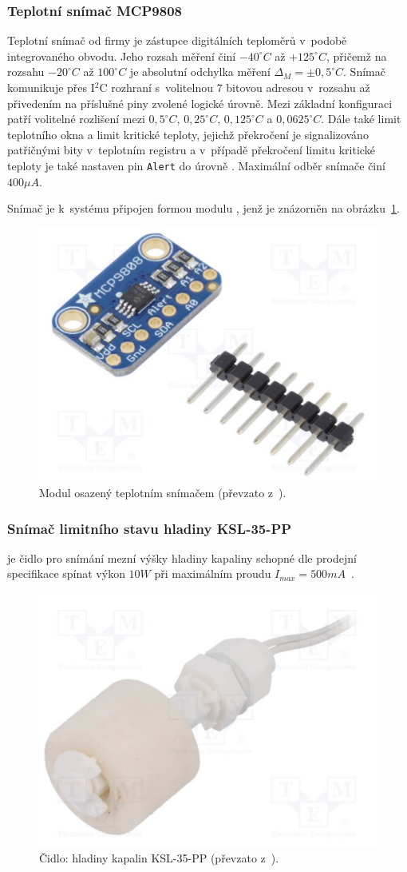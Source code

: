             \subsubsection{Teplotní snímač MCP9808}
                Teplotní snímač  od firmy  je zástupce digitálních teploměrů v~podobě integrovaného obvodu. Jeho rozsah měření činí $-40^\circ\unit{C}$ až $+125^\circ\unit{C}$, přičemž na rozsahu $-20^\circ\unit{C}$ až $100^\circ\unit{C}$ je absolutní odchylka měření $\Delta_M=\pm0,5^\circ\unit{C}$. Snímač komunikuje přes I$^2$C rozhraní s~volitelnou 7 bitovou adresou v~rozsahu  až  přivedením na příslušné piny zvolené logické úrovně. Mezi základní konfiguraci patří volitelné rozlišení mezi $0,5^\circ\unit{C}$, $0,25^\circ\unit{C}$, $0,125^\circ\unit{C}$ a $0,0625^\circ\unit{C}$. Dále také limit teplotního okna a limit kritické teploty, jejichž překročení je signalizováno patřičnými bity v~teplotním registru a v~případě překročení limitu kritické teploty je také nastaven pin \texttt{Alert} do úrovně . Maximální odběr snímače činí $400\unit{\mu A}$.~\cite{sensor:mcp}

                Snímač je k~systému připojen formou modulu , jenž je znázorněn na obrázku~\ref{img:mcp}.
                \begin{figure}[h]
                    \centering
                    \includegraphics[width=0.3\linewidth]{obrazky-figures/mcp.pdf}
                    \caption{Modul  osazený teplotním snímačem  (převzato z~\cite{shop:mcp}).}
                    \label{img:mcp}
                \end{figure}

            \subsubsection{Snímač limitního stavu hladiny KSL-35-PP}
                 je čidlo pro snímání mezní výšky hladiny kapaliny schopné dle prodejní specifikace spínat výkon $10\unit{W}$ při maximálním proudu $I_{max}=500\unit{mA}$~\cite{shop:ksl}.
                \begin{figure}[h]
                    \centering
                    \includegraphics[width=0.35\linewidth]{obrazky-figures/pk.pdf}
                    \caption{Čidlo: hladiny kapalin KSL-35-PP (převzato z~\cite{shop:ksl}).}
                    \label{img:pk}
                \end{figure}

